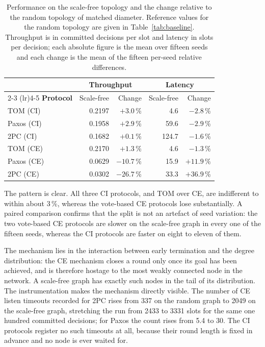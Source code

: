 \documentclass[journal]{IEEEtran}
\newcommand{\CI}{CI}                      %
\newcommand{\CE}{CE}                      %
\begin{document}
\begin{table}[!t]
\caption{Performance on the scale-free topology and the change relative to
the random topology of matched diameter. Reference values for the random
topology are given in Table~\ref{tab:baseline}. Throughput is in committed
decisions per slot and latency in slots per decision; each absolute figure is
the mean over fifteen seeds and each change is the mean of the fifteen
per-seed relative differences.}
\label{tab:degree}
\centering
\footnotesize
\setlength{\tabcolsep}{4pt}
\begin{tabular}{@{}lrrrr@{}}
\toprule
 & \multicolumn{2}{c}{\textbf{Throughput}} &
   \multicolumn{2}{c}{\textbf{Latency}} \\
\cmidrule(lr){2-3} \cmidrule(lr){4-5}
\textbf{Protocol} & Scale-free & Change & Scale-free & Change \\
\midrule
TOM (\CI)   & 0.2197 & $+3.0$\,\%  & 4.6   & $-2.8$\,\%  \\
Paxos (\CI) & 0.1958 & $+2.9$\,\%  & 59.6  & $-2.9$\,\%  \\
2PC (\CI)   & 0.1682 & $+0.1$\,\%  & 124.7 & $-1.6$\,\%  \\
TOM (\CE)   & 0.2170 & $+1.3$\,\%  & 4.6   & $-1.3$\,\%  \\
\addlinespace
Paxos (\CE) & 0.0629 & $-10.7$\,\% & 15.9  & $+11.9$\,\% \\
2PC (\CE)   & 0.0302 & $-26.7$\,\% & 33.3  & $+36.9$\,\% \\
\bottomrule
\end{tabular}
\end{table}

The pattern is clear. All three \CI{} protocols, and TOM over \CE, are
indifferent to within about 3\,\%, whereas the vote-based \CE{} protocols
lose substantially. A paired comparison confirms that the split is not an
artefact of seed variation: the two vote-based \CE{} protocols are slower on
the scale-free graph in every one of the fifteen seeds, whereas the \CI{}
protocols are faster on eight to eleven of them.

The mechanism lies in the interaction between early termination and the
degree distribution: the \CE{} mechanism closes a round only once its goal
has been achieved, and is therefore hostage to the most weakly connected node
in the network. A scale-free graph has exactly such nodes in the tail of its
distribution. The instrumentation makes the mechanism directly visible. The
number of \CE{} listen timeouts recorded for 2PC rises from 337 on the random
graph to 2049 on the scale-free graph, stretching the run from 2433 to 3331
slots for the same one hundred committed decisions; for Paxos the count rises
from 5.4 to 30. The \CI{} protocols register no such timeouts at all, because
their round length is fixed in advance and no node is ever waited for.
\end{document}

